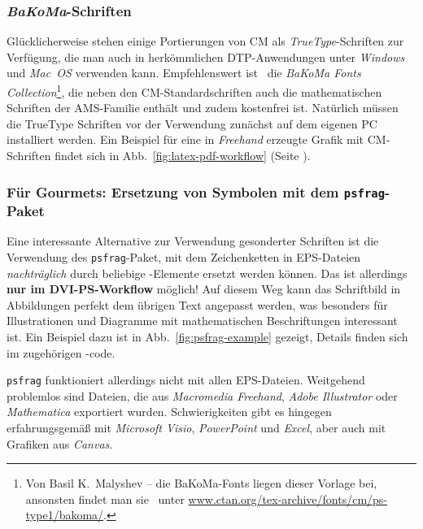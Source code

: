 \subsubsection{\emph{BaKoMa}-Schriften}

Glücklicherweise stehen einige Portierungen von CM als {\em
TrueType}-Schriften zur Verfügung, die man auch in herkömmlichen
DTP-Anwendungen unter \emph{Windows} und \emph{Mac~OS} verwenden
kann. Empfehlenswert ist \va\ die \emph{BaKoMa Fonts
Collection}\footnote{Von Basil K.\ Malyshev -- die BaKoMa-Fonts
liegen dieser Vorlage bei, ansonsten findet man sie \zB\ unter
\url{www.ctan.org/tex-archive/fonts/cm/ps-type1/bakoma/}.}, die
neben den CM-Standardschriften auch die mathematischen Schriften
der AMS-Familie ent\-hält und zudem kostenfrei ist. Natürlich
müssen die TrueType Schriften vor der Verwendung zunächst auf dem
eigenen PC installiert werden. Ein Beispiel für eine in {\em
Freehand} erzeugte Grafik mit CM-Schriften findet sich in
Abb.~\ref{fig:latex-pdf-workflow} (Seite
\pageref{fig:latex-pdf-workflow}).


\subsubsection{Für Gourmets: Ersetzung von Symbolen mit dem \texttt{psfrag}-Paket}
\label{sec:psfrag}

Eine interessante Alternative zur Verwendung gesonderter Schriften ist die Verwendung des \texttt{psfrag}-Paket,
mit dem Zeichenketten in EPS-Dateien \emph{nachträglich} durch beliebige \latex-Elemente ersetzt werden können. 
Das ist allerdings \textbf{nur im DVI-PS-Workflow} möglich!
Auf diesem Weg kann das Schriftbild in Abbildungen perfekt dem übrigen Text angepasst werden, was besonders für Illustrationen und Diagramme mit mathematischen Beschriftungen interessant ist. Ein Beispiel dazu ist in Abb.\ \ref{fig:psfrag-example} gezeigt, Details finden sich im zugehörigen \latex-code.

\texttt{psfrag} funktioniert allerdings nicht mit allen EPS-Dateien. Weitgehend problemlos sind Dateien, die aus \emph{Macromedia Freehand}, \emph{Adobe Illustrator} oder \emph{Mathematica} exportiert wurden. Schwierig\-keiten gibt es hingegen erfahrungsgemäß mit \emph{Microsoft Visio}, \emph{PowerPoint} und \emph{Excel}, aber auch mit Grafiken aus \emph{Canvas}.

%

